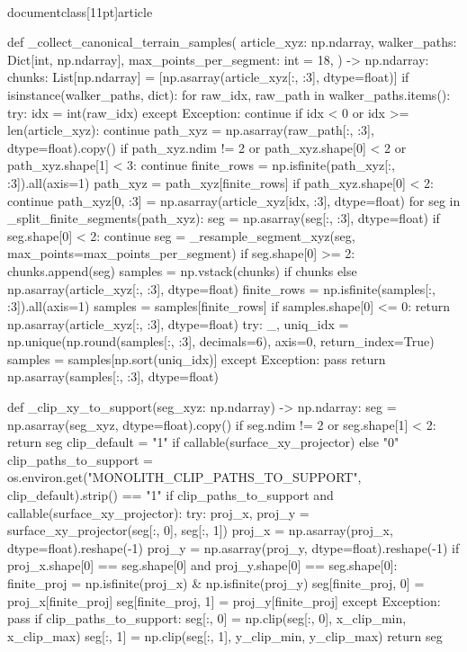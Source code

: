 \\documentclass[11pt]{article}
\begin{document}
\begin{CodeBlock}
{{    def _collect_canonical_terrain_samples(
        article_xyz: np.ndarray,
        walker_paths: Dict[int, np.ndarray],
        max_points_per_segment: int = 18,
    ) -> np.ndarray:
        chunks: List[np.ndarray] = [np.asarray(article_xyz[:, :3], dtype=float)]
        if isinstance(walker_paths, dict):
            for raw_idx, raw_path in walker_paths.items():
                try:
                    idx = int(raw_idx)
                except Exception:
                    continue
                if idx < 0 or idx >= len(article_xyz):
                    continue
                path_xyz = np.asarray(raw_path[:, :3], dtype=float).copy()
                if path_xyz.ndim != 2 or path_xyz.shape[0] < 2 or path_xyz.shape[1] < 3:
                    continue
                finite_rows = np.isfinite(path_xyz[:, :3]).all(axis=1)
                path_xyz = path_xyz[finite_rows]
                if path_xyz.shape[0] < 2:
                    continue
                path_xyz[0, :3] = np.asarray(article_xyz[idx, :3], dtype=float)
                for seg in _split_finite_segments(path_xyz):
                    seg = np.asarray(seg[:, :3], dtype=float)
                    if seg.shape[0] < 2:
                        continue
                    seg = _resample_segment_xyz(seg, max_points=max_points_per_segment)
                    if seg.shape[0] >= 2:
                        chunks.append(seg)
        samples = np.vstack(chunks) if chunks else np.asarray(article_xyz[:, :3], dtype=float)
        finite_rows = np.isfinite(samples[:, :3]).all(axis=1)
        samples = samples[finite_rows]
        if samples.shape[0] <= 0:
            return np.asarray(article_xyz[:, :3], dtype=float)
        try:
            _, uniq_idx = np.unique(np.round(samples[:, :3], decimals=6), axis=0, return_index=True)
            samples = samples[np.sort(uniq_idx)]
        except Exception:
            pass
        return np.asarray(samples[:, :3], dtype=float)

    def _clip_xy_to_support(seg_xyz: np.ndarray) -> np.ndarray:
        seg = np.asarray(seg_xyz, dtype=float).copy()
        if seg.ndim != 2 or seg.shape[1] < 2:
            return seg
        clip_default = "1" if callable(surface_xy_projector) else "0"
        clip_paths_to_support = os.environ.get("MONOLITH_CLIP_PATHS_TO_SUPPORT", clip_default).strip() == "1"
        if clip_paths_to_support and callable(surface_xy_projector):
            try:
                proj_x, proj_y = surface_xy_projector(seg[:, 0], seg[:, 1])
                proj_x = np.asarray(proj_x, dtype=float).reshape(-1)
                proj_y = np.asarray(proj_y, dtype=float).reshape(-1)
                if proj_x.shape[0] == seg.shape[0] and proj_y.shape[0] == seg.shape[0]:
                    finite_proj = np.isfinite(proj_x) & np.isfinite(proj_y)
                    seg[finite_proj, 0] = proj_x[finite_proj]
                    seg[finite_proj, 1] = proj_y[finite_proj]
            except Exception:
                pass
        if clip_paths_to_support:
            seg[:, 0] = np.clip(seg[:, 0], x_clip_min, x_clip_max)
            seg[:, 1] = np.clip(seg[:, 1], y_clip_min, y_clip_max)
        return seg

}}
\end{CodeBlock}
\end{document}
